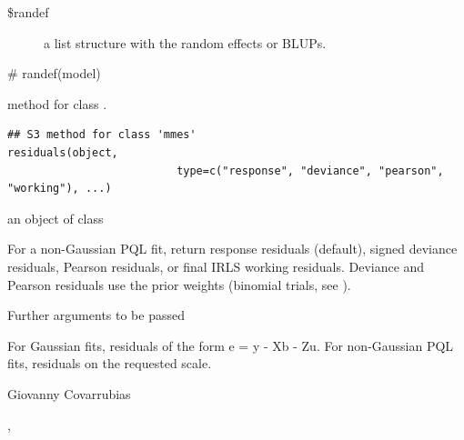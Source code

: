 \documentclass[a4paper]{book}
\begin{document}
%
\begin{Value}
\begin{description}

\item[\$randef]  a list structure with the random effects or BLUPs.

\end{description}

\end{Value}
%
\begin{Examples}
\begin{ExampleCode}
# randef(model)
\end{ExampleCode}
\end{Examples}
%
\begin{Description}\relax
{} method for class .
\end{Description}
%
\begin{Usage}
\begin{verbatim}
## S3 method for class 'mmes'
residuals(object,
                          type=c("response", "deviance", "pearson", "working"), ...)
\end{verbatim}
\end{Usage}
%
\begin{Arguments}
\begin{ldescription}
\item[\code{object}] an object of class 
\item[\code{type}] For a non-Gaussian PQL fit, return response residuals (default),
signed deviance residuals, Pearson residuals, or final IRLS working residuals.
Deviance and Pearson residuals use the prior weights (binomial trials, see
).
\item[\code{...}] Further arguments to be passed
\end{ldescription}
\end{Arguments}
%
\begin{Value}
For Gaussian fits, residuals of the form e = y - Xb - Zu. For non-Gaussian
PQL fits, residuals on the requested scale.

\end{Value}
%
\begin{Author}\relax
Giovanny Covarrubias
\end{Author}
%
\begin{SeeAlso}\relax
{}, 
\end{SeeAlso}
\end{document}
